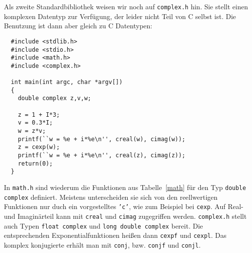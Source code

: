 Als zweite Standardbibliothek weisen wir noch auf \texttt{complex.h} hin.
Sie stellt einen komplexen Datentyp zur Verfügung, der leider nicht Teil von C selbst ist.
Die Benutzung ist dann aber gleich zu C Datentypen:
\begin{lstlisting}
  #include <stdlib.h>
  #include <stdio.h>
  #include <math.h>
  #include <complex.h>
  
  int main(int argc, char *argv[])
  {
    double complex z,v,w;
    
    z = 1 + I*3;
    v = 0.3*I;
    w = z*v;
    printf(``w = %e + i*%e\n'', creal(w), cimag(w));
    z = cexp(w);
    printf(``w = %e + i*%e\n'', creal(z), cimag(z));
    return(0);
  }
\end{lstlisting}
In \texttt{math.h} sind wiederum die Funktionen aus Tabelle~\ref{math} für den Typ \texttt{double complex} definiert.
Meistens unterscheiden sie sich von den reellwertigen Funktionen nur duch ein vorgestelltes \texttt{'c'}, wie zum Beispiel bei \texttt{cexp}.
Auf Real- und Imaginärteil kann mit \texttt{creal} und \texttt{cimag} zugegriffen werden.
\texttt{complex.h} stellt auch Typen \texttt{float complex} und \texttt{long double complex} bereit.
Die entsprechenden Exponentialfunktionen heißen dann \texttt{cexpf} und \texttt{cexpl}.
Das komplex konjugierte erhält man mit \texttt{conj}, bzw. \texttt{conjf} und \texttt{conjl}.
